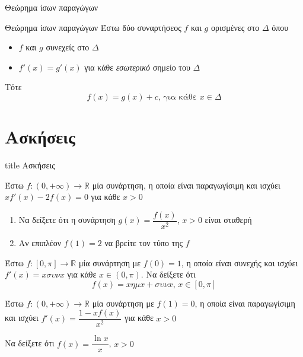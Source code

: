 \documentclass{presentation}
\begin{document}
\begin{frame}{Θεώρημα ίσων παραγώγων}
  \begin{block}{Θεώρημα ίσων παραγώγων}
    Έστω δύο συναρτήσεος $f$ και $g$ ορισμένες στο $Δ$ όπου
    \begin{itemize}
      \item $f$ και $g$ συνεχείς στο $Δ$
      \item $f'(x)=g'(x)$ για κάθε \emph{εσωτερικό} σημείο του $Δ$
    \end{itemize}
    Τότε
    $$f(x)=g(x)+c \text{, για κάθε } x\in Δ$$
  \end{block}
\end{frame}


\section{Ασκήσεις}

\begin{frame}[noframenumbering]
  \vfill
  \centering
  \begin{beamercolorbox}[sep=8pt,center,shadow=true,rounded=true]{title}
    Ασκήσεις
  \end{beamercolorbox}
  \vfill
\end{frame}

\begin{askisi}
  Έστω $f:(0,+\infty)\to\mathbb{R}$ μία συνάρτηση, η οποία είναι παραγωγίσιμη και ισχύει $xf'(x)-2f(x)=0$ για κάθε $x>0$
  \begin{enumerate}[<+->]
    \item Να δείξετε ότι η συνάρτηση $g(x)=\dfrac{f(x)}{x^2}$, $x>0$ είναι σταθερή
    \item Αν επιπλέον $f(1)=2$ να βρείτε τον τύπο της $f$
  \end{enumerate}

\end{askisi}

\begin{askisi}
  Έστω $f:[0,π]\to\mathbb{R}$ μία συνάρτηση με $f(0)=1$, η οποία είναι συνεχής και ισχύει $f'(x)=xσυνx$ για κάθε $x\in (0,π)$. Να δείξετε ότι
  $$f(x)=xημx+συνx \text{, } x\in [0,π]$$

\end{askisi}

\begin{askisi}
  Έστω $f:(0,+\infty)\to\mathbb{R}$ μία συνάρτηση με $f(1)=0$, η οποία είναι παραγωγίσιμη και ισχύει $f'(x)=\dfrac{1-xf(x)}{x^2}$ για κάθε $x>0$

  Να δείξετε ότι $f(x)=\dfrac{\ln x}{x}$, $x>0$

\end{askisi}
\end{document}
